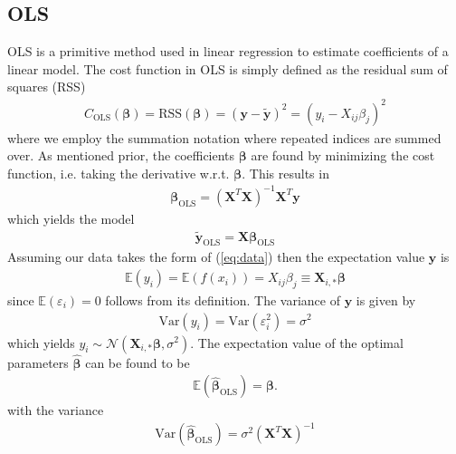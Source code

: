 \documentclass[%
reprint,
amsmath,amssymb,
aps,
pra,
]{revtex4-2}
\begin{document}
\subsection{OLS}	\label{sec:THEORY_OLS}
OLS is a primitive method used in linear regression to estimate coefficients of a linear model. The cost function in OLS is simply defined as the residual sum of squares (RSS)
\begin{align*}
	C_\text{OLS}(\bm\beta)=\text{RSS}(\bm\beta)=(\bm y-\tilde{\bm y})^2=(y_i-X_{ij}\beta_j)^2
\end{align*}
where we employ the summation notation where repeated indices are summed over. As mentioned prior, the coefficients $\bm\beta$ are found by minimizing the cost function, i.e. taking the derivative w.r.t. $\bm\beta$. This results in
\begin{align*}
	\bm\beta_\text{OLS}=(\bm X^T\bm X)^{-1}\bm X^T\bm y
\end{align*}
which yields the model
\begin{align}
	\tilde{\bm y}_\text{OLS}=\bm X\bm \beta_\text{OLS}
\end{align}
Assuming our data takes the form of (\ref{eq:data}) then the expectation value $\bm y$ is
\begin{align*}
	\mathbb{E}(y_i)=\mathbb{E}(f(x_i))=X_{ij}\beta_j\equiv\bm X_{i,*}\bm\beta
\end{align*}
since $\mathbb{E}(\varepsilon_i)=0$ follows from its definition. The variance of $\bm y$ is given by
\begin{align*}
	\text{Var}(y_i)=\text{Var}(\varepsilon_i^2)=\sigma^2
\end{align*}
which yields $y_i\sim\mathcal{N}(\bm X_{i,*}\bm\beta,\sigma^2)$. The expectation value of the optimal parameters $\hat{\bm\beta}$ can be found to be
\begin{align*}
	\mathbb{E}(\hat{\bm\beta}_\text{OLS})=\bm\beta.
\end{align*}
with the variance
\begin{align*}
	\text{Var}(\hat{\bm\beta}_\text{OLS})=\sigma^2(\bm X^T \bm X)^{-1}
\end{align*}
\end{document}
